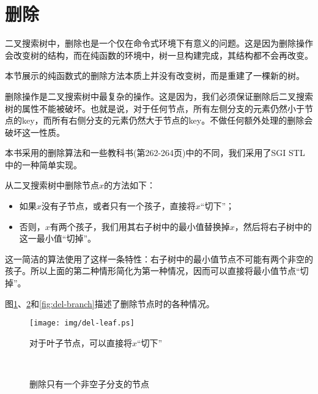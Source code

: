 \documentclass{ctexart}
\begin{document}
\section{删除}
二叉搜索树中，删除也是一个仅在命令式环境下有意义的问题。这是因为删除操作会改变树的结构，而在纯函数的环境中，树一旦构建完成，其结构都不会再改变。

本节展示的纯函数式的删除方法本质上并没有改变树，而是重建了一棵新的树。

删除操作是二叉搜索树中最复杂的操作。这是因为，我们必须保证删除后二叉搜索树的属性不能被破坏。也就是说，对于任何节点，所有左侧分支的元素仍然小于节点的key，而所有右侧分支的元素仍然大于节点的key。不做任何额外处理的删除会破坏这一性质。

本书采用的删除算法和一些教科书(\cite{CLRS}第262-264页)中的不同，我们采用了SGI STL中的一种简单实现\cite{sgi-stl}。

从二叉搜索树中删除节点$x$的方法如下：
\begin{itemize}
\item 如果$x$没有子节点，或者只有一个孩子，直接将$x$“切下”；
\item 否则，$x$有两个孩子，我们用其右子树中的最小值替换掉$x$，然后将右子树中的这一最小值“切掉”。
\end{itemize}

这一简洁的算法使用了这样一条特性：右子树中的最小值节点不可能有两个非空的孩子。所以上面的第二种情形简化为第一种情况，因而可以直接将最小值节点“切掉”。

图\ref{fig:del-leaf}、\ref{fig:del-1child}和\ref{fig:del-branch}描述了删除节点时的各种情况。

\begin{figure}[htbp]
  \centering
  \texttt{[image: img/del-leaf.ps]}
  \caption{对于叶子节点，可以直接将$x$“切下”} \label{fig:del-leaf}
\end{figure}

\begin{figure}[htbp]
  \centering
   \\
  \caption{删除只有一个非空子分支的节点}
  \label{fig:del-1child}
\end{figure}
\end{document}
